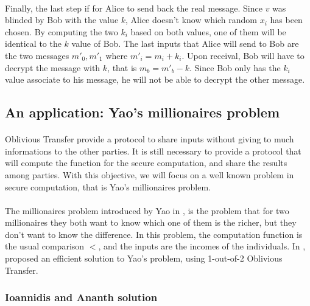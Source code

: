 \documentclass[11pt,a4paper]{article}
\begin{document}
\paragraph{}

Finally, the last step if for Alice to send back the real message.
Since $v$ was blinded by Bob
with the value $k$, Alice doesn't know which random $x_i$ has been chosen.
By computing the two $k_i$ based on both values, one of them
will be identical to the $k$ value of Bob. The last inputs that
Alice will send to Bob are the two messages $m'_0, m'_1$ where
$m'_i = m_i + k_i$. Upon receival, Bob will have to decrypt
the message with $k$, that is $m_b = m'_b - k$. Since Bob
only has the $k_i$ value associate to his message, he will not be
able to decrypt the other message.

\subsection{An application: Yao's millionaires problem}

\paragraph{}

Oblivious Transfer provide a protocol  to share inputs without
giving to much informations to the other parties. It is
still necessary to provide a protocol that will
compute the function for the secure computation, and share
the results among parties. With this objective, we will
focus on a well known problem in secure computation, that
is Yao's millionaires problem.

\paragraph{}

The millionaires problem introduced by Yao in
\cite{yao_protocols_1982}, is the problem that for two millionaires
they both want to know which one of them is the richer, but they
don't want to know the difference. In this problem, the computation
function is the usual comparison $<$, and the inputs are the incomes of
the individuals. In \cite{hutchison_efficient_2005},
proposed an efficient solution to Yao's problem, using 1-out-of-2
Oblivious Transfer.


\subsubsection{Ioannidis and Ananth solution}
\end{document}
